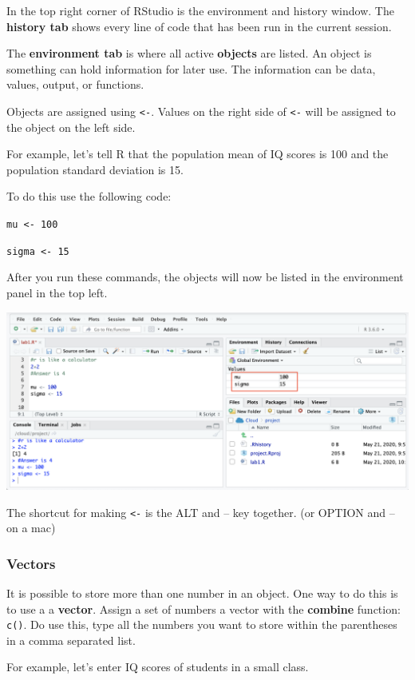 \documentclass[
]{book}
\begin{document}
In the top right corner of RStudio is the environment and history window. The \textbf{history tab} shows every line of code that has been run in the current session.

The \textbf{environment tab} is where all active \textbf{objects} are listed. An object is something can hold information for later use. The information can be data, values, output, or functions.

Objects are assigned using \texttt{\textless{}-}. Values on the right side of \texttt{\textless{}-} will be assigned to the object on the left side.

For example, let's tell R that the population mean of IQ scores is 100 and the population standard deviation is 15.

To do this use the following code:

\texttt{mu\ \textless{}-\ 100}

\texttt{sigma\ \textless{}-\ 15}

After you run these commands, the objects will now be listed in the environment panel in the top left.

\includegraphics{img/object.png}

The shortcut for making \texttt{\textless{}-} is the ALT and -- key together. (or OPTION and -- on a mac)

\hypertarget{vectors}{%
\subsubsection{Vectors}\label{vectors}}

It is possible to store more than one number in an object. One way to do this is to use a a \textbf{vector}. Assign a set of numbers a vector with the \textbf{combine} function: \texttt{c()}. Do use this, type all the numbers you want to store within the parentheses in a comma separated list.

For example, let's enter IQ scores of students in a small class.
\end{document}
